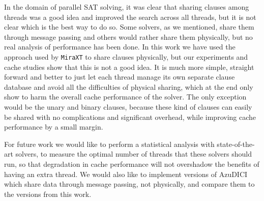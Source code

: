 \documentclass[12pt]{diicc}
\begin{document}
In the domain of parallel SAT solving, it was clear that sharing clauses among threads was a good idea and improved the search across all threads, but it is not clear which is the best way to do so. Some solvers, as we mentioned, share them through message passing and others would rather share them physically, but no real analysis of performance has been done. In this work we have used the approach used by \texttt{MiraXT} to share clauses physically, but our experiments and cache studies show that this is not a good idea. It is much more simple, straight forward and better to just let each thread manage its own separate clause database and avoid all the difficulties of physical sharing, which at the end only show to harm the overall cache performance of the solver. The only exception would be the unary and binary clauses, because these kind of clauses can easily be shared with no complications and significant overhead, while improving cache performance by a small margin. 

For future work we would like to perform a statistical analysis with state-of-the-art solvers, to measure the optimal number of threads that these solvers should run, so that degradation in cache performance will not overshadow the benefits of having an extra thread. We would also like to implement versions of AzuDICI which share data through message passing, not physically, and compare them to the versions from this work. 

%
% 
%


\end{document}
